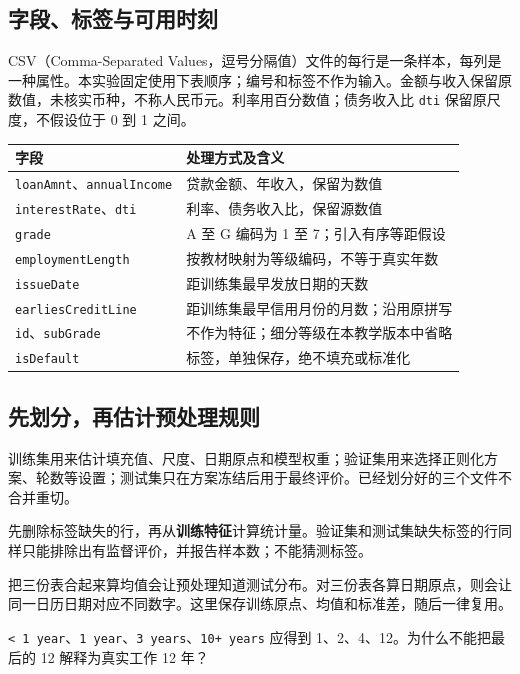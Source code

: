 \documentclass[UTF8,a4paper,11pt,fontset=fandol]{ctexart}
\newcommand{\file}[1]{\nolinkurl{#1}}
\begin{document}
\subsection{字段、标签与可用时刻}
CSV（Comma-Separated Values，逗号分隔值）文件的每行是一条样本，每列是一种属性。本实验固定使用下表顺序；编号和标签不作为输入。金额与收入保留原数值，未核实币种，不称人民币元。利率用百分数值；债务收入比 \file{dti} 保留原尺度，不假设位于 0 到 1 之间。
\begin{center}\par\noindent\begin{tabularx}{\linewidth}{L{4cm}Y}
\toprule 字段 & 处理方式及含义\\\midrule
\file{loanAmnt}、\file{annualIncome} & 贷款金额、年收入，保留为数值\\
\file{interestRate}、\file{dti} & 利率、债务收入比，保留源数值\\
\file{grade} & A 至 G 编码为 1 至 7；引入有序等距假设\\
\file{employmentLength} & 按教材映射为等级编码，不等于真实年数\\
\file{issueDate} & 距训练集最早发放日期的天数\\
\file{earliesCreditLine} & 距训练集最早信用月份的月数；沿用原拼写\\
\file{id}、\file{subGrade} & 不作为特征；细分等级在本教学版本中省略\\
\file{isDefault} & 标签，单独保存，绝不填充或标准化\\\bottomrule
\end{tabularx}\end{center}
\subsection{先划分，再估计预处理规则}
训练集用来估计填充值、尺度、日期原点和模型权重；验证集用来选择正则化方案、轮数等设置；测试集只在方案冻结后用于最终评价。已经划分好的三个文件不合并重切。

先删除标签缺失的行，再从\textbf{训练特征}计算统计量。验证集和测试集缺失标签的行同样只能排除出有监督评价，并报告样本数；不能猜测标签。
\begin{pitfallbox}[看似无监督的统计量也可能泄漏]
把三份表合起来算均值会让预处理知道测试分布。对三份表各算日期原点，则会让同一日历日期对应不同数字。这里保存训练原点、均值和标准差，随后一律复用。
\end{pitfallbox}
\begin{questionbox}
\texttt{< 1 year}、\texttt{1 year}、\texttt{3 years}、\texttt{10+ years} 应得到 1、2、4、12。为什么不能把最后的 12 解释为真实工作 12 年？
\end{questionbox}
\clearpage
\end{document}
